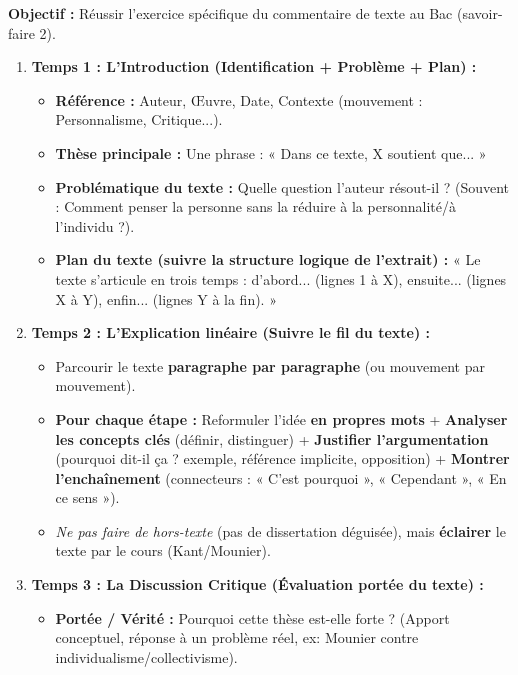 \documentclass[11pt]{article}
\begin{document}
\begin{methode}
\textbf{Objectif :} Réussir l'exercice spécifique du commentaire de texte au Bac (savoir-faire 2).
\begin{enumerate}
    \item \textbf{Temps 1 : L'Introduction (Identification + Problème + Plan) :}
    \begin{itemize}
        \item \textbf{Référence :} Auteur, Œuvre, Date, Contexte (mouvement : Personnalisme, Critique...).
        \item \textbf{Thèse principale :} Une phrase : « Dans ce texte, X soutient que... »
        \item \textbf{Problématique du texte :} Quelle question l'auteur résout-il ? (Souvent : Comment penser la personne sans la réduire à la personnalité/à l'individu ?).
        \item \textbf{Plan du texte (suivre la structure logique de l'extrait) :} « Le texte s'articule en trois temps : d'abord... (lignes 1 à X), ensuite... (lignes X à Y), enfin... (lignes Y à la fin). »
    \end{itemize}
    \item \textbf{Temps 2 : L'Explication linéaire (Suivre le fil du texte) :}
    \begin{itemize}
        \item Parcourir le texte \textbf{paragraphe par paragraphe} (ou mouvement par mouvement).
        \item \textbf{Pour chaque étape :} Reformuler l'idée \textbf{en propres mots} + \textbf{Analyser les concepts clés} (définir, distinguer) + \textbf{Justifier l'argumentation} (pourquoi dit-il ça ? exemple, référence implicite, opposition) + \textbf{Montrer l'enchaînement} (connecteurs : « C'est pourquoi », « Cependant », « En ce sens »).
        \item \textit{Ne pas faire de hors-texte} (pas de dissertation déguisée), mais \textbf{éclairer} le texte par le cours (Kant/Mounier).
    \end{itemize}
    \item \textbf{Temps 3 : La Discussion Critique (Évaluation portée du texte) :}
    \begin{itemize}
        \item \textbf{Portée / Vérité :} Pourquoi cette thèse est-elle forte ? (Apport conceptuel, réponse à un problème réel, ex: Mounier contre individualisme/collectivisme).

\end{itemize}
\end{enumerate}
\end{methode}
\end{document}

